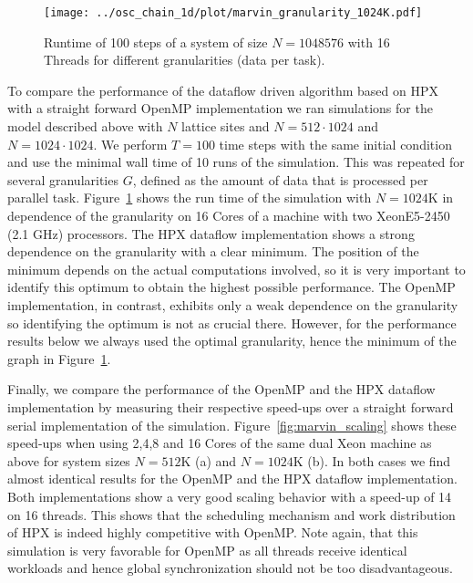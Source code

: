 \documentclass[a4wide,10pt]{scrartcl}
\begin{document}
\begin{figure}
  \centering
  \texttt{[image: ../osc\_chain\_1d/plot/marvin\_granularity\_1024K.pdf]}\hfill
  \caption{Runtime of 100 steps of a system of size $N=1048576$ with 16 Threads for different granularities (data per task).} 
  \label{fig:granularity_marvin_1024K}
\end{figure}

To compare the performance of the dataflow driven algorithm based on HPX with a straight forward OpenMP implementation we ran simulations for the model described above with $N$ lattice sites and $N=512\cdot1024$ and $N=1024\cdot1024$.
We perform $T=100$ time steps with the same initial condition and use the minimal wall time of 10 runs of the simulation.
This was repeated for several granularities $G$, defined as the amount of data that is processed per parallel task.
Figure~\ref{fig:granularity_marvin_1024K} shows the run time of the simulation with $N=1024\text{K}$ in dependence of the granularity on 16 Cores of a machine with two XeonE5-2450 (2.1 GHz) processors.
The HPX dataflow implementation shows a strong dependence on the granularity with a clear minimum.
The position of the minimum depends on the actual computations involved, so it is very important to identify this optimum to obtain the highest possible performance.
The OpenMP implementation, in contrast, exhibits only a weak dependence on the granularity so identifying the optimum is not as crucial there.
However, for the performance results below we always used the optimal granularity, hence the minimum of the graph in Figure~\ref{fig:granularity_marvin_1024K}.

Finally, we compare the performance of the OpenMP and the HPX dataflow implementation by measuring their respective speed-ups over a straight forward serial implementation of the simulation.
Figure~\ref{fig:marvin_scaling} shows these speed-ups when using 2,4,8 and 16 Cores of the same dual Xeon machine as above for system sizes $N=512\text{K}$ (a) and $N=1024\text{K}$ (b).
In both cases we find almost identical results for the OpenMP and the HPX dataflow implementation.
Both implementations show a very good scaling behavior with a speed-up of 14 on 16 threads.
This shows that the scheduling mechanism and work distribution of HPX is indeed highly competitive with OpenMP.
Note again, that this simulation is very favorable for OpenMP as all threads receive identical workloads and hence global synchronization should not be too disadvantageous.
\end{document}
